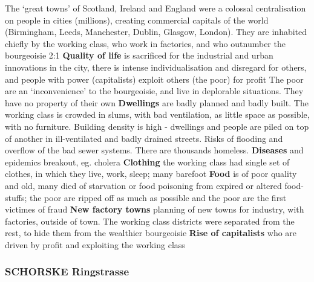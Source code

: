 \documentclass{article}
\begin{document}
\begin{outline}
	\1 The `great towns' of Scotland, Ireland and England were a colossal centralisation on people in cities (millions), creating commercial capitals of the world (Birmingham, Leeds, Manchester, Dublin, Glasgow, London). They are inhabited chiefly by the working class, who work in factories, and who outnumber the bourgeoisie 2:1
	\1 \textbf{Quality of life} is sacrificed for the industrial and urban innovations in the city, there is intense individualisation and disregard for others, and people with power (capitalists) exploit others (the poor) for profit
		\2 The poor are an `inconvenience' to the bourgeoisie, and live in deplorable situations. They have no property of their own
		\2 \textbf{Dwellings} are badly planned and badly built. The working class is crowded in slums, with bad ventilation, as little space as possible, with no furniture. Building density is high - dwellings and people are piled on top of another in ill-ventilated and badly drained streets. Risks of flooding and overflow of the bad sewer systems. There are thousands homeless.
		\2 \textbf{Diseases} and epidemics breakout, eg. cholera
		\2 \textbf{Clothing} the working class had single set of clothes, in which they live, work, sleep; many barefoot
		\2 \textbf{Food} is of poor quality and old, many died of starvation or food poisoning from expired or altered food-stuffs; the poor are ripped off as much as possible and the poor are the first victimes of fraud
	\1 \textbf{New factory towns} planning of new towns for industry, with factories, outside of town. The working class districts were separated from the rest, to hide them from the wealthier bourgeoisie
	\1 \textbf{Rise of capitalists} who are driven by profit and exploiting the working class
\end{outline}

\subsubsection{SCHORSKE Ringstrasse}
\end{document}
